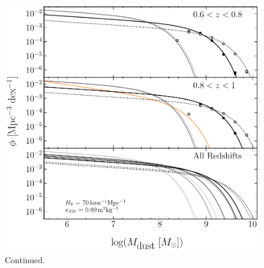 \begin{figure}
    \ContinuedFloat
    \centering
    \includegraphics[width=\columnwidth]{Figures/Figure_3_5_part2.pdf}
    \caption{Continued.}
\end{figure}

